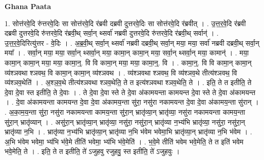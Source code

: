 \documentclass[17pt]{extarticle}
\begin{document}
\textbf{Ghana Paata } \newline

1. सोत्त॑रवे॒दि रु॑त्तरवे॒दिः सा सोत्त॑रवे॒दि र॑ब्रवी दब्रवी दुत्तरवे॒दिः सा सोत्त॑रवे॒दि र॑ब्रवीत् । . उ॒त्त॒र॒वे॒दि र॑ब्रवी दब्रवी दुत्तरवे॒दि रु॑त्तरवे॒दि र॑ब्रवी॒थ् सर्वा॒न् थ्सर्वा॑ नब्रवी दुत्तरवे॒दि रु॑त्तरवे॒दि र॑ब्रवी॒थ् सर्वान्॑ । . उ॒त्त॒र॒वे॒दिरित्यु॑त्तर - वे॒दिः । . अ॒ब्र॒वी॒थ् सर्वा॒न् थ्सर्वा॑ नब्रवी दब्रवी॒थ् सर्वा॒न् मया॒ मया॒ सर्वा॑ नब्रवी दब्रवी॒थ् सर्वा॒न् मया᳚ । . सर्वा॒न् मया॒ मया॒ सर्वा॒न् थ्सर्वा॒न् मया॒ कामा॒न् कामा॒न् मया॒ सर्वा॒न् थ्सर्वा॒न् मया॒ कामान्॑ । . मया॒ कामा॒न् कामा॒न् मया॒ मया॒ कामा॒न्॒. वि वि कामा॒न् मया॒ मया॒ कामा॒न्॒. वि । . कामा॒न्॒. वि वि कामा॒न् कामा॒न् व्य॑श्ञवथा श्ञवथ॒ वि कामा॒न् कामा॒न् व्य॑श्ञवथ । . व्य॑श्ञवथा श्ञवथ॒ वि व्य॑श्ञव॒थे तीत्य॑श्ञवथ॒ वि व्य॑श्ञव॒थेति॑ । . अ॒श्ञ॒व॒थे तीत्य॑श्ञवथा श्ञव॒थेति॒ ते त इत्य॑श्ञवथा श्ञव॒थेति॒ ते । . इति॒ ते त इतीति॒ ते दे॒वा दे॒वा स्त इतीति॒ ते दे॒वाः । . ते दे॒वा दे॒वा स्ते ते दे॒वा अ॑कामयन्ता कामयन्त दे॒वा स्ते ते दे॒वा अ॑कामयन्त । . दे॒वा अ॑कामयन्ता कामयन्त दे॒वा दे॒वा अ॑कामय॒न्ता सु॑रा॒ नसु॑रा नकामयन्त दे॒वा दे॒वा अ॑कामय॒न्ता सु॑रान् । . अ॒का॒म॒य॒न्ता सु॑रा॒ नसु॑रा नकामयन्ता कामय॒न्ता सु॑रा॒न् भ्रातृ॑व्या॒न् भ्रातृ॑व्या॒ नसु॑रा नकामयन्ता कामय॒न्ता सु॑रा॒न् भ्रातृ॑व्यान् । . असु॑रा॒न् भ्रातृ॑व्या॒न् भ्रातृ॑व्या॒ नसु॑रा॒ नसु॑रा॒न् भ्रातृ॑व्या न॒भ्य॑भि भ्रातृ॑व्या॒ नसु॑रा॒ नसु॑रा॒न् भ्रातृ॑व्या न॒भि । . भ्रातृ॑व्या न॒भ्य॑भि भ्रातृ॑व्या॒न् भ्रातृ॑व्या न॒भि भ॑वेम भवेमा॒भि भ्रातृ॑व्या॒न् भ्रातृ॑व्या न॒भि भ॑वेम । . अ॒भि भ॑वेम भवेमा॒ भ्य॑भि भ॑वे॒मे तीति॑ भवेमा॒ भ्य॑भि भ॑वे॒मेति॑ । . भ॒वे॒मे तीति॑ भवेम भवे॒मेति॒ ते त इति॑ भवेम भवे॒मेति॒ ते । . इति॒ ते त इतीति॒ ते॑ ऽजुहवु रजुहवु॒ स्त इतीति॒ ते॑ ऽजुहवुः । \newline
\end{document}
